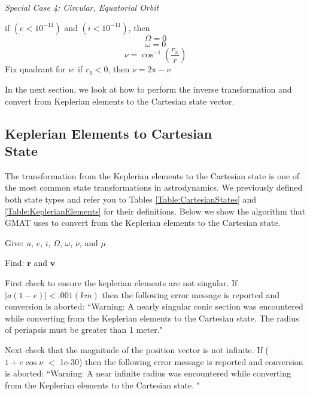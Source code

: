 \noindent\textit{Special Case 4:  Circular, Equatorial Orbit  }

\noindent if $(e < 10^{-11})$  and $(i < 10^{-11})$, then
%
\begin{equation}
     \Omega = 0
\end{equation}
%
\begin{equation}
     \omega = 0
\end{equation}
%
\begin{equation}
    \nu = \cos^{-1}\left( \frac{r_x}{r}\right)
\end{equation}
%
Fix quadrant for $\nu$:  if $r_y < 0$, then $\nu = 2\pi - \nu$
%

In the next section, we look at how to perform the inverse
transformation and convert from Keplerian elements to the
Cartesian state vector.

\subsection{Keplerian Elements to Cartesian \\ State}


\label{Sec:Kep2Cart}  

The transformation from the Keplerian elements to the Cartesian
state is one of the most common state transformations in
astrodynamics.  We previously defined both state types and refer you
to Tables \ref{Table:CartesianStates} and
\ref{Table:KeplerianElements} for their definitions.  Below we show
the algorithm that GMAT uses to convert from the Keplerian elements
to the Cartesian state\cite{Vallado:02}.

\noindent Give:  $a$, $e$, $i$, $\Omega$, $\omega$, $\nu$, and
$\mu$

\noindent Find:  $\mathbf{r}$  and $\mathbf{v}$

First check to ensure the keplerian elements are not singular. If $|a(1-e)| < .001 (km)$ then the following error message is reported and conversion is aborted: ``Warning: A nearly singular conic section was encountered while converting from the Keplerian elements to the Cartesian state.  The radius of periapsis must be greater than 1 meter."

Next check that the magnitude of the position vector is
not infinite.  If ($1+e\cos{\nu}$ $<$ 1e-30) then the following error message is reported and conversion is aborted:
``Warning: A near infinite radius  was encountered while converting from the Keplerian elements to the Cartesian state. "


